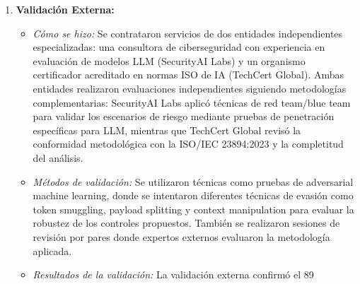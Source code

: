 \documentclass[12pt]{article}
\begin{document}
\begin{enumerate}
\begin{itemize}
            \item \textit{Framework implementado:} Se adoptó una versión adaptada del marco CVSS (Common Vulnerability Scoring System) modificado para contextos de IA, incorporando métricas específicas para modelos LLM como "potencial de manipulación", "detectabilidad de alucinaciones" y "persistencia del efecto".
            \item \textit{Hallazgos significativos:} De los 42 riesgos identificados, 7 fueron clasificados como "críticos" (requiriendo mitigación inmediata), 15 como "altos", 12 como "medios" y 8 como "bajos". Se identificó que el 71%
            \item \textit{Propósito:} Esta categorización permitió establecer prioridades claras de intervención, asignando recursos de manera eficiente y desarrollando planes de respuesta proporcionales a la severidad de cada riesgo, conforme al Art. 6.2.7 de la ISO/IEC 23894:2023 sobre "priorización basada en criterios predefinidos".
        \end{itemize}
    \item \textbf{Validación Externa:}
        \begin{itemize}
            \item \textit{Cómo se hizo:} Se contrataron servicios de dos entidades independientes especializadas: una consultora de ciberseguridad con experiencia en evaluación de modelos LLM (SecurityAI Labs) y un organismo certificador acreditado en normas ISO de IA (TechCert Global). Ambas entidades realizaron evaluaciones independientes siguiendo metodologías complementarias: SecurityAI Labs aplicó técnicas de red team/blue team para validar los escenarios de riesgo mediante pruebas de penetración específicas para LLM, mientras que TechCert Global revisó la conformidad metodológica con la ISO/IEC 23894:2023 y la completitud del análisis.
            \item \textit{Métodos de validación:} Se utilizaron técnicas como pruebas de adversarial machine learning, donde se intentaron diferentes técnicas de evasión como token smuggling, payload splitting y context manipulation para evaluar la robustez de los controles propuestos. También se realizaron sesiones de revisión por pares donde expertos externos evaluaron la metodología aplicada.
            \item \textit{Resultados de la validación:} La validación externa confirmó el 89%

\end{itemize}
\end{enumerate}
\end{document}
